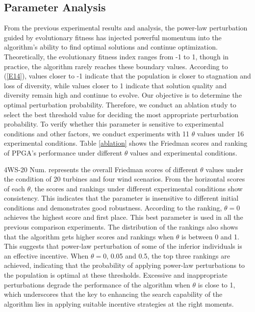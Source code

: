 \documentclass[journal,twoside]{IEEEtran}
\begin{document}
\subsection{Parameter Analysis}
From the previous experimental results and analysis, the power-law perturbation guided by evolutionary fitness has injected powerful momentum into the algorithm's ability to find optimal solutions and continue optimization. Theoretically, the evolutionary fitness index ranges from -1 to 1, though in practice, the algorithm rarely reaches these boundary values. According to (\ref{E14}), values closer to -1 indicate that the population is closer to stagnation and loss of diversity, while values closer to 1 indicate that solution quality and diversity remain high and continue to evolve. Our objective is to determine the optimal perturbation probability. Therefore, we conduct an ablation study to select the best threshold value for deciding the most appropriate perturbation probability. To verify whether this parameter is sensitive to experimental conditions and other factors, we conduct experiments with 11 $\theta$ values under 16 experimental conditions. Table \ref{ablation} shows the Friedman scores and ranking \cite{10460144} of PPGA's performance under different $\theta$ values and experimental conditions.

4WS-20 Num. represents the overall Friedman scores of different $\theta$ values under the condition of 20 turbines and four wind scenarios. From the horizontal scores of each $\theta$, the scores and rankings under different experimental conditions show consistency. This indicates that the parameter is insensitive to different initial conditions and demonstrates good robustness. According to the ranking, $\theta=0$ achieves the highest score and first place. This best parameter is used in all the previous comparison experiments. The distribution of the rankings also shows that the algorithm gets higher scores and rankings when $\theta$ is between 0 and 1. This suggests that power-law perturbation of some of the inferior individuals is an effective incentive. When $\theta=0$, 0.05 and 0.5, the top three rankings are achieved, indicating that the probability of applying power-law perturbations to the population is optimal at these thresholds. Excessive and inappropriate perturbations degrade the performance of the algorithm when $\theta$ is close to 1, which underscores that the key to enhancing the search capability of the algorithm lies in applying suitable incentive strategies at the right moments.
\end{document}
